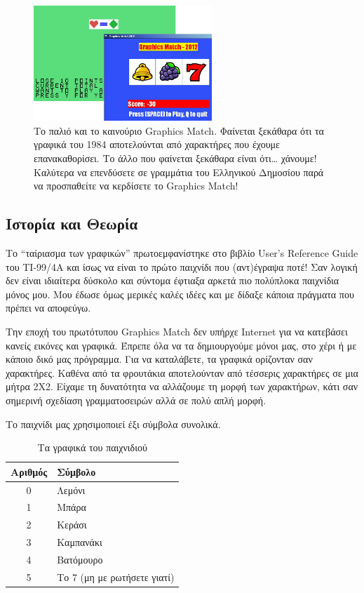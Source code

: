 \begin{figure}
  \centering
  \includegraphics[width=0.6\textwidth]{images/chapter6/graphics-match}
  \caption[Graphics Match, Παλιό και Νέο]{Το παλιό και το καινούριο Graphics Match. Φαίνεται ξεκάθαρα ότι
τα γραφικά του 1984 αποτελούνται από χαρακτήρες που έχουμε επανακαθορίσει.
Το άλλο που φαίνεται ξεκάθαρα είναι ότι\ldots{} χάνουμε! Καλύτερα να
επενδύσετε σε γραμμάτια του Ελληνικού Δημοσίου παρά να προσπαθείτε να
κερδίσετε το Graphics Match!}
  \label{6-1}
\end{figure}
%
\subsection{Ιστορία και Θεωρία}
%
Το ``ταίριασμα των γραφικών'' πρωτοεμφανίστηκε στο βιβλίο User's Reference Guide του ΤΙ-99/4Α και ίσως να είναι το πρώτο παιχνίδι που (αντ)έγραψα ποτέ! Σαν λογική δεν είναι ιδιαίτερα δύσκολο και σύντομα έφτιαξα αρκετά πιο πολύπλοκα παιχνίδια μόνος μου. Μου έδωσε όμως μερικές καλές ιδέες και με δίδαξε κάποια πράγματα που πρέπει να αποφεύγω.

Την εποχή του πρωτότυπου Graphics Match δεν υπήρχε Internet για να κατεβάσει κανείς εικόνες και γραφικά. Έπρεπε όλα να τα δημιουργούμε μόνοι μας, στο χέρι ή με κάποιο δικό μας πρόγραμμα. Για να καταλάβετε, τα γραφικά ορίζονταν σαν χαρακτήρες. Καθένα από τα φρουτάκια αποτελούνταν από τέσσερις χαρακτήρες σε μια μήτρα 2Χ2. Είχαμε τη δυνατότητα να αλλάζουμε τη μορφή των χαρακτήρων, κάτι σαν σημερινή σχεδίαση γραμματοσειρών αλλά σε πολύ απλή μορφή.

Το παιχνίδι μας χρησιμοποιεί έξι σύμβολα συνολικά.

\begin{table}[H]
\begin{center}
\begin{tabular}{|c|l|}
\hline
\textbf{Αριθμός} & \textbf{Σύμβολο} \\
\hline
0 & Λεμόνι \\
\hline
1 & Μπάρα \\
\hline
2 & Κεράσι \\
\hline
3 & Καμπανάκι \\
\hline
4 & Βατόμουρο \\
\hline
5 & Το 7 (μη με ρωτήσετε γιατί) \\
\hline
\end{tabular}
\end{center}
\caption{Τα γραφικά του παιχνιδιού}
\label{t6-1}
\end{table}


